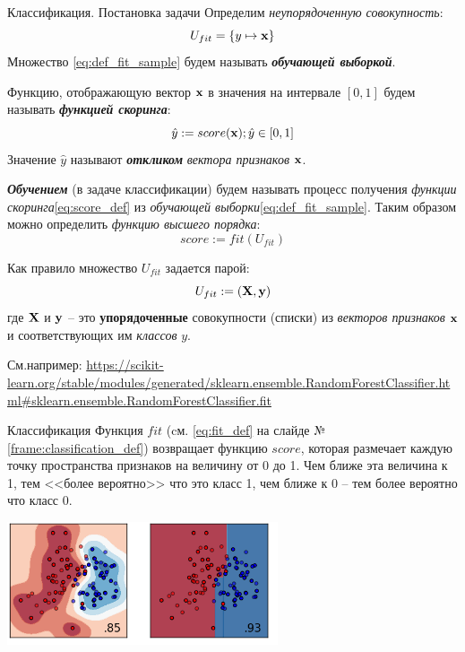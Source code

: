 \documentclass{beamer}
\newcommand{\termdef}[1]{\textbf{\textit{#1}}}
\newcommand{\term}{\textit}
\begin{document}
  \begin{frame}{Классификация. Постановка задачи}\label{frame:classification_def}
  	Определим \term{неупорядоченную совокупность}:
  	\begin{equation}\label{eq:def_fit_sample}
  	U_{fit} = \left\{ y \mapsto \bold x  \right\}
  	\end{equation}
  	Множество \eqref{eq:def_fit_sample} будем называть \termdef{обучающей выборкой}.
  	
  	Функцию, отображающую вектор $\bold x$ в значения на интервале $[0, 1]$ будем 
  	называть \termdef{функцией скоринга}:
  	\begin{equation}\label{eq:score_def}
  	\hat{y} := score( \bold x); \hat{y} \in [0, 1]
  	\end{equation}
  	Значение $\hat{y}$ называют \termdef{откликом} \term{вектора признаков} $\bold x$.
  	
  	\termdef{Обучением} (в задаче классификации) будем называть процесс получения 
  	\term{функции скоринга}\eqref{eq:score_def} 
  	из 
  	\term{обучающей выборки}\eqref{eq:def_fit_sample}.
  	Таким образом можно определить \term{функцию высшего порядка}:
  	\begin{equation}\label{eq:fit_def}
  	score := fit (U_{fit}) 
  	\end{equation}
  \end{frame}

	\begin{frame}
	Как правило множество $U_{fit}$ задается парой:
	\begin{equation}
		U_{fit} := (\bold X, \bold y) 
	\end{equation}
	где $\bold X$ и $\bold y$ -- это \textbf{упорядоченные} совокупности (списки)
	из \term{векторов признаков} $\bold  x$ и соответствующих им \term{классов} $y$. 
	
	См.например:
	\url{https://scikit-learn.org/stable/modules/generated/sklearn.ensemble.RandomForestClassifier.html\#sklearn.ensemble.RandomForestClassifier.fit}
	\end{frame}


	  
	\begin{frame}{Классификация}
	Функция $fit$ (cм. \eqref{eq:fit_def} на слайде №\ref{frame:classification_def}) возвращает функцию $score$, которая размечает каждую точку пространства признаков на величину от 0 до 1. Чем ближе эта величина к 1, тем <<более вероятно>> что это класс 1, чем ближе к 0 -- тем более вероятно что класс 0.
	\begin{center}
		\includegraphics[width=8cm]{../pic/classification_example.png}\centering
	\end{center}
\end{frame}
\end{document}
